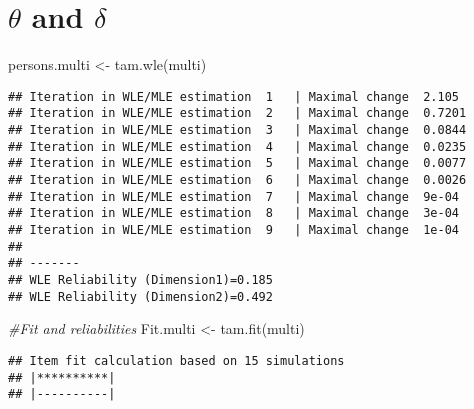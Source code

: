 \documentclass[
]{book}
\newenvironment{Shaded}{\begin{snugshade}}{\end{snugshade}}
\newcommand{\CommentTok}[1]{\textcolor[rgb]{0.56,0.35,0.01}{\textit{#1}}}
\newcommand{\FunctionTok}[1]{\textcolor[rgb]{0.00,0.00,0.00}{#1}}
\newcommand{\NormalTok}[1]{#1}
\newcommand{\OtherTok}[1]{\textcolor[rgb]{0.56,0.35,0.01}{#1}}
\newcommand{\SpecialCharTok}[1]{\textcolor[rgb]{0.00,0.00,0.00}{#1}}
\begin{document}
\hypertarget{theta-and-delta}{%
\section{\texorpdfstring{\(\theta\) and \(\delta\)}{\textbackslash theta and \textbackslash delta}}\label{theta-and-delta}}

\begin{Shaded}
\begin{Highlighting}[]
\NormalTok{persons.multi }\OtherTok{\textless{}{-}} \FunctionTok{tam.wle}\NormalTok{(multi)}
\end{Highlighting}
\end{Shaded}

\begin{verbatim}
## Iteration in WLE/MLE estimation  1   | Maximal change  2.105 
## Iteration in WLE/MLE estimation  2   | Maximal change  0.7201 
## Iteration in WLE/MLE estimation  3   | Maximal change  0.0844 
## Iteration in WLE/MLE estimation  4   | Maximal change  0.0235 
## Iteration in WLE/MLE estimation  5   | Maximal change  0.0077 
## Iteration in WLE/MLE estimation  6   | Maximal change  0.0026 
## Iteration in WLE/MLE estimation  7   | Maximal change  9e-04 
## Iteration in WLE/MLE estimation  8   | Maximal change  3e-04 
## Iteration in WLE/MLE estimation  9   | Maximal change  1e-04 
## 
## -------
## WLE Reliability (Dimension1)=0.185 
## WLE Reliability (Dimension2)=0.492
\end{verbatim}

\begin{Shaded}
\end{Shaded}

\begin{Shaded}
\begin{Highlighting}[]
\CommentTok{\#Fit and reliabilities}
\NormalTok{Fit.multi }\OtherTok{\textless{}{-}} \FunctionTok{tam.fit}\NormalTok{(multi)}
\end{Highlighting}
\end{Shaded}

\begin{verbatim}
## Item fit calculation based on 15 simulations
## |**********|
## |----------|
\end{verbatim}
\end{document}
